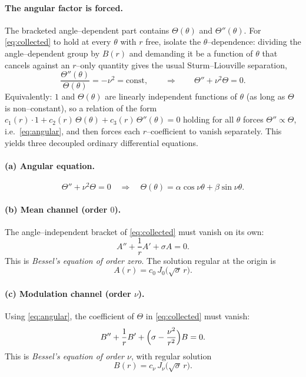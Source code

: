 \documentclass{article}
\begin{document}
\paragraph{The angular factor is forced.} The bracketed angle--dependent part
contains $\Theta(\theta)$ and $\Theta''(\theta)$. For \eqref{eq:collected} to
hold at every $\theta$ with $r$ free, isolate the $\theta$--dependence: dividing
the angle--dependent group by $B(r)$ and demanding it be a function of $\theta$
that cancels against an $r$--only quantity gives the usual Sturm--Liouville
separation,
\begin{equation}
\frac{\Theta''(\theta)}{\Theta(\theta)}=-\nu^2=\text{const},
\qquad\Longrightarrow\qquad
\Theta''+\nu^2\Theta=0 .
\label{eq:angular}
\end{equation}
Equivalently: $1$ and $\Theta(\theta)$ are linearly independent functions of
$\theta$ (as long as $\Theta$ is non--constant), so a relation of the form
$c_1(r)\cdot 1+c_2(r)\,\Theta(\theta)+c_3(r)\,\Theta''(\theta)=0$ holding for all
$\theta$ forces $\Theta''\propto\Theta$, i.e.\ \eqref{eq:angular}, and then forces
each $r$--coefficient to vanish separately. This yields three decoupled
ordinary differential equations.

\paragraph{(a) Angular equation.}
\begin{equation}
\Theta''+\nu^2\Theta=0
\quad\Longrightarrow\quad
\Theta(\theta)=\alpha\cos\nu\theta+\beta\sin\nu\theta .
\label{eq:Theta}
\end{equation}

\paragraph{(b) Mean channel (order $0$).} The angle--independent bracket of
\eqref{eq:collected} must vanish on its own:
\begin{equation}
A''+\frac1r A'+\sigma A=0 .
\label{eq:Aeq}
\end{equation}
This is \emph{Bessel's equation of order zero}. The solution regular at the
origin is
\begin{equation}
A(r)=c_0\,J_0\!\bigl(\sqrt\sigma\,r\bigr).
\label{eq:Asol}
\end{equation}

\paragraph{(c) Modulation channel (order $\nu$).} Using \eqref{eq:angular}, the
coefficient of $\Theta$ in \eqref{eq:collected} must vanish:
\begin{equation}
B''+\frac1r B'+\Bigl(\sigma-\frac{\nu^2}{r^2}\Bigr)B=0 .
\label{eq:Beq}
\end{equation}
This is \emph{Bessel's equation of order $\nu$}, with regular solution
\begin{equation}
B(r)=c_\nu\,J_\nu\!\bigl(\sqrt\sigma\,r\bigr).
\label{eq:Bsol}
\end{equation}
\end{document}
